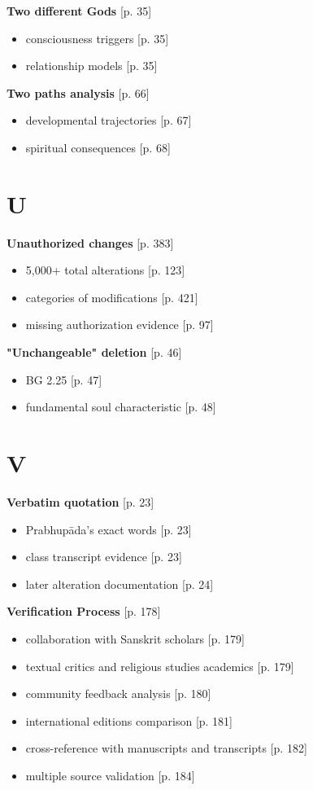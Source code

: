 \documentclass[11pt,twoside]{book}
\begin{document}
\textbf{\textbf{Two different Gods}} {[}p. 35]
\begin{itemize}
\item consciousness triggers [p. 35]
\item relationship models [p. 35]
\end{itemize}

\textbf{\textbf{Two paths analysis}} {[}p. 66]
\begin{itemize}
\item developmental trajectories [p. 67]
\item spiritual consequences [p. 68]
\end{itemize}
\section*{U}
\label{sec:org29bc5f5}

\textbf{\textbf{Unauthorized changes}} {[}p. 383]
\begin{itemize}
\item 5,000+ total alterations [p. 123]
\item categories of modifications [p. 421]
\item missing authorization evidence [p. 97]
\end{itemize}

\textbf{\textbf{"Unchangeable" deletion}} {[}p. 46]
\begin{itemize}
\item BG 2.25 [p. 47]
\item fundamental soul characteristic [p. 48]
\end{itemize}
\section*{V}
\label{sec:org79ed339}

\textbf{\textbf{Verbatim quotation}} {[}p. 23]
\begin{itemize}
\item Prabhupāda's exact words [p. 23]
\item class transcript evidence [p. 23]
\item later alteration documentation [p. 24]
\end{itemize}

\textbf{\textbf{Verification Process}} {[}p. 178]
\begin{itemize}
\item collaboration with Sanskrit scholars [p. 179]
\item textual critics and religious studies academics [p. 179]
\item community feedback analysis [p. 180]
\item international editions comparison [p. 181]
\item cross-reference with manuscripts and transcripts [p. 182]
\item multiple source validation [p. 184]
\end{itemize}
\end{document}
